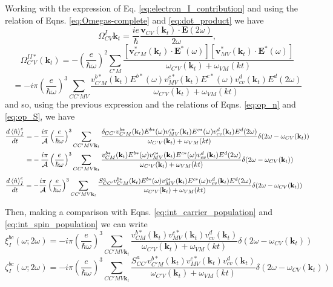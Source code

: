 \documentclass{article}
\newcommand{\kt}{\mathbf{k}_{t}}
\newcommand{\dw}{\delta(2\omega - \omega_{CV}(\kt))}
\begin{document}
Working with the expression of Eq. \eqref{eq:electron_I_contribution} and using
the relation of Eqns. \eqref{eq:Omegas-complete} and  \eqref{eq:dot_product} we
have
\begin{equation*}
\Omega^{I}_{CV}{\kt} = \frac{ie}{\hbar}
\frac{\mathbf{v}_{CV}(\kt) \cdot \mathbf{E}(2\omega)}{2\omega} ,
\end{equation*}
\begin{equation*}
\Omega^{II*}_{C'V}(\kt) = - \left(\frac{e}{\hbar\omega}\right)^{2}
\sum_{C'M} \frac{[\mathbf{v}^{*}_{C'M}(\kt) \cdot \mathbf{E}^{*}(\omega)]
[\mathbf{v}^{*}_{MV}(\kt)\cdot\mathbf{E}^{*}(\omega)]}{\omega_{C'V}(\kt)+\omega_{VM}(kt)}
\end{equation*}
\begin{equation}
[\Omega^{II*}_{C'V}(\kt) \Omega^{I}_{CV}{\kt}] =  -i \pi \left( \frac{e}{\hbar\omega} 
\right)^{3} \sum_{CC'MV} \frac{v^{b*}_{C'M}(\kt) E^{b*}(\omega)
v^{c*}_{MV}(\kt) E^{c*}(\omega) v^{d}_{cv}(\kt) E^{d}(2\omega) }
{\omega_{C'V}(\kt)+\omega_{VM}(kt)}
\end{equation}
and so, using the previous expression and the relations of Eqns. \eqref{eq:op_n} and
\eqref{eq:op_S}, we have 
\begin{equation}
\begin{split}
\frac{d\ev*{\hat{n}}^{e}_{I}}{dt} =&
- \frac{i \pi}{\mathcal{A}} \left( \frac{e}{\hbar\omega} 
\right)^{3} \sum_{CC'MV\kt} \frac{\delta_{CC'}v^{b*}_{C'M}(\kt) E^{b*}(\omega)
v^{c*}_{MV}(\kt) E^{c*}(\omega) v^{d}_{cv}(\kt) E^{d}(2\omega) }
{\omega_{C'V}(\kt)+\omega_{VM}(kt)} \dw \\
=& - \frac{i \pi}{\mathcal{A}} \left( \frac{e}{\hbar\omega} 
\right)^{3} \sum_{CC'MV\kt} \frac{v^{b*}_{CM}(\kt) E^{b*}(\omega)
v^{c*}_{MV}(\kt) E^{c*}(\omega) v^{d}_{cv}(\kt) E^{d}(2\omega) }
{\omega_{C'V}(\kt)+\omega_{VM}(kt)} \dw
\end{split}
\end{equation}
\begin{equation}
\begin{split}
\frac{d\ev*{\hat{n}}^{e}_{I}}{dt} &=
- \frac{i \pi}{\mathcal{A}} \left( \frac{e}{\hbar\omega} 
\right)^{3} \sum_{CC'MV\kt} \frac{S^{a}_{CC'}v^{b*}_{C'M}(\kt) E^{b*}(\omega)
v^{c*}_{MV}(\kt) E^{c*}(\omega) v^{d}_{cv}(\kt) E^{d}(2\omega) }
{\omega_{C'V}(\kt)+\omega_{VM}(kt)} \dw
\end{split}
\end{equation}

Then, making a comparison with Eqns. \eqref{eq:int_carrier_population} and 
\eqref{eq:int_spin_population} we can write 
\begin{equation*}
\xi^{bc}_{I}(\omega;2\omega) =  - i \pi \left( \frac{e}{\hbar\omega} 
\right)^{3} \sum_{CC'MV\kt} \frac{v^{b*}_{CM}(\kt)
v^{c*}_{MV}(\kt) v^{d}_{cv}(\kt) }
{\omega_{C'V}(\kt)+\omega_{VM}(kt)} \dw
\end{equation*}
\begin{equation*}
\zeta^{bc}_{I}(\omega;2\omega) = - i \pi \left( \frac{e}{\hbar\omega} 
\right)^{3} \sum_{CC'MV\kt} \frac{S^{a}_{CC'}v^{b*}_{C'M}(\kt)
v^{c*}_{MV}(\kt) v^{d}_{cv}(\kt) }
{\omega_{C'V}(\kt)+\omega_{VM}(kt)} \dw
\end{equation*}




\end{document}
